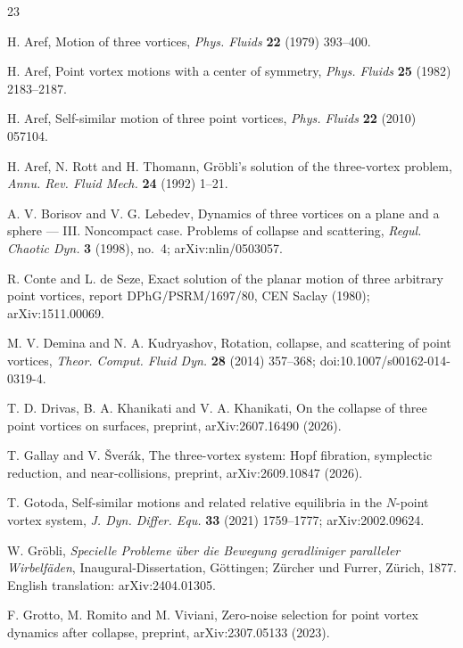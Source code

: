 \documentclass[11pt]{article}
\theoremstyle{definition}
\begin{document}
\begin{thebibliography}{23}
\small

 H. Aref, Motion of three vortices, \emph{Phys. Fluids} \textbf{22} (1979) 393--400.

 H. Aref, Point vortex motions with a center of symmetry, \emph{Phys. Fluids} \textbf{25} (1982) 2183--2187.

 H. Aref, Self-similar motion of three point vortices, \emph{Phys. Fluids} \textbf{22} (2010) 057104.

 H. Aref, N. Rott and H. Thomann, Gr\"obli's solution of the three-vortex problem, \emph{Annu. Rev. Fluid Mech.} \textbf{24} (1992) 1--21.

 A. V. Borisov and V. G. Lebedev, Dynamics of three vortices on a plane and a sphere --- III. Noncompact case. Problems of collapse and scattering, \emph{Regul. Chaotic Dyn.} \textbf{3} (1998), no.~4; arXiv:nlin/0503057.

 R. Conte and L. de Seze, Exact solution of the planar motion of three arbitrary point vortices, report DPhG/PSRM/1697/80, CEN Saclay (1980); arXiv:1511.00069.

 M. V. Demina and N. A. Kudryashov, Rotation, collapse, and scattering of point vortices, \emph{Theor. Comput. Fluid Dyn.} \textbf{28} (2014) 357--368; doi:10.1007/s00162-014-0319-4.

 T. D. Drivas, B. A. Khanikati and V. A. Khanikati, On the collapse of three point vortices on surfaces, preprint, arXiv:2607.16490 (2026).

 T. Gallay and V. \v{S}ver\'ak, The three-vortex system: Hopf fibration, symplectic reduction, and near-collisions, preprint, arXiv:2609.10847 (2026).

 T. Gotoda, Self-similar motions and related relative equilibria in the $N$-point vortex system, \emph{J. Dyn. Differ. Equ.} \textbf{33} (2021) 1759--1777; arXiv:2002.09624.

 W. Gr\"obli, \emph{Specielle Probleme \"uber die Bewegung geradliniger paralleler Wirbelf\"aden}, Inaugural-Dissertation, G\"ottingen; Z\"urcher und Furrer, Z\"urich, 1877. English translation: arXiv:2404.01305.

 F. Grotto, M. Romito and M. Viviani, Zero-noise selection for point vortex dynamics after collapse, preprint, arXiv:2307.05133 (2023).


\end{thebibliography}
\end{document}

